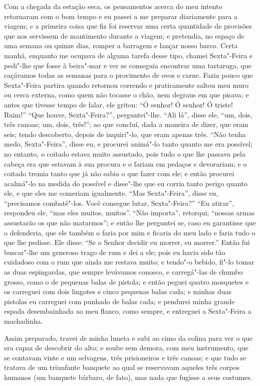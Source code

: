 Com a chegada da estação seca, os pensamentos acerca do meu intento
retornaram com o bom tempo e eu passei a me preparar diariamente para a
viagem; e a primeira coisa que fiz foi reservar uma certa quantidade de
provisões que nos servissem de mantimento durante a viagem; e pretendia,
no espaço de uma semana ou quinze dias, romper a barragem e lançar nosso
barco. Certa manhã, enquanto me ocupava de alguma tarefa desse tipo,
chamei Sexta"-Feira e pedi"-lhe que fosse à beira"-mar e ver se conseguia
encontrar uma tartaruga, que caçávamos todas as semanas para o
provimento de ovos e carne. Fazia pouco que Sexta"-Feira partira quando
retornou correndo e praticamente saltou meu muro ou cerca externa, como
quem não tocasse o chão, nem degraus em que pisava; e antes que tivesse
tempo de falar, ele gritou: ``Ó senhor! Ó senhor! Ó triste! Ruim!''
``Que houve, Sexta"-Feira?'', perguntei"-lhe. ``Ali lá'', disse ele, ``um,
dois, três canoas; um, dois, três!''; ao que concluí, dada a maneira de
dizer, que eram seis; tendo descoberto, depois de inquiri"-lo, que eram
apenas três. ``Não tenha medo, Sexta"-Feira'', disse eu, e procurei
animá"-lo tanto quanto me era possível; no entanto, o coitado estava
muito assustado, pois tudo o que lhe passava pela cabeça era que estavam
à sua procura e o fariam em pedaços e devorariam; e o coitado tremia
tanto que já não sabia o que fazer com ele; e então procurei acalmá"-lo
na medida do possível e disse"-lhe que eu corria tanto perigo quanto ele,
e que eles me comeriam igualmente. ``Mas Sexta"-Feira'', disse eu,
``precisamos combatê"-los. Você consegue lutar, Sexta"-Feira?'' ``Eu
atirar'', respondeu ele, ``mas eles muitos, muitos''. ``Não importa'',
retorqui; ``nossas armas assustarão os que não matarmos''; e então lhe
perguntei se, caso eu garantisse que o defenderia, que ele também o
faria por mim e ficaria do meu lado e faria tudo o que lhe pedisse. Ele
disse: ``Se o Senhor decidir eu morrer, eu morrer.'' Então fui
buscar"-lhe um generoso trago de rum e dei a ele; pois eu havia sido tão
cuidadoso com o rum que ainda me restava muito; e tendo"-o bebido, fi"-lo
tomar as duas espingardas, que sempre levávamos conosco, e carregá"-las
de chumbo grosso, como o de pequenas balas de pistola; e então peguei
quatro mosquetes e os carreguei com dois lingotes e cinco pequenas balas
cada; e minhas duas pistolas eu carreguei com punhado de balas cada; e
pendurei minha grande espada desembainhada ao meu flanco, como sempre, e
entreguei a Sexta"-Feira a machadinha.

Assim preparado, travei de minha luneta e subi ao cimo da colina para
ver o que era capaz de descobrir do alto; e soube sem demora, com meu
instrumento, que se contavam vinte e um selvagens, três prisioneiros e
três canoas; e que tudo se tratava de um triunfante banquete ao qual se
reservavam aqueles três corpos humanos (um banquete bárbaro, de fato),
mas nada que fugisse a seus costumes.

